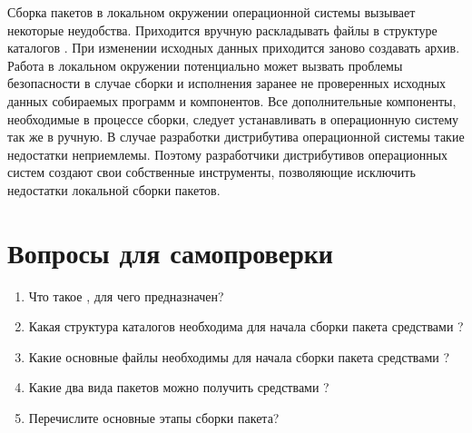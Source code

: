 Сборка пакетов в локальном окружении операционной системы вызывает некоторые неудобства.
Приходится вручную раскладывать файлы в структуре каталогов . При изменении
исходных данных приходится заново создавать архив. Работа в локальном окружении потенциально
может вызвать проблемы безопасности в случае сборки и исполнения заранее не проверенных исходных
данных собираемых программ и компонентов. Все дополнительные компоненты, необходимые
в процессе сборки, следует устанавливать в операционную систему так же в ручную.
В случае разработки дистрибутива операционной системы такие недостатки неприемлемы.
Поэтому разработчики дистрибутивов операционных систем создают свои собственные инструменты,
позволяющие исключить недостатки локальной сборки пакетов.

\section{Вопросы для самопроверки}

\begin{enumerate}
	\item Что такое , для чего предназначен?
	\item Какая структура каталогов необходима для начала сборки пакета средствами ?
	\item Какие основные файлы необходимы для начала сборки пакета средствами ?
	\item Какие два вида пакетов можно получить средствами ?
	\item Перечислите основные этапы сборки пакета?
\end{enumerate}
